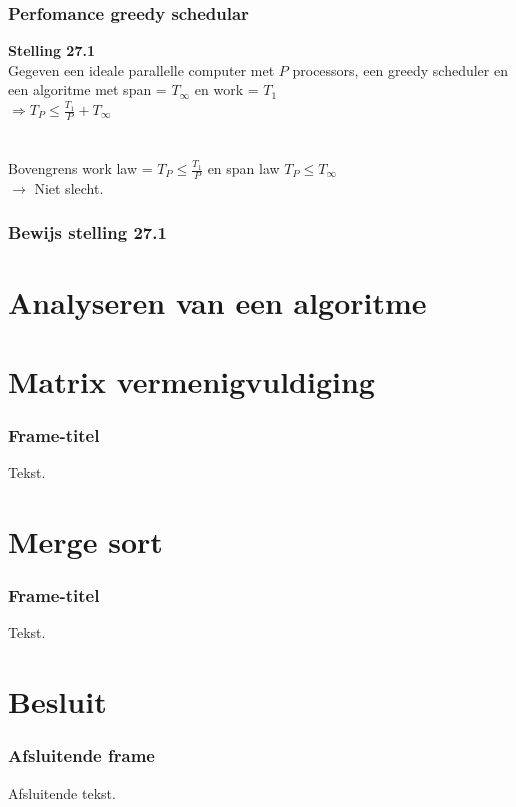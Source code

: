 \documentclass
   [kulak] %
   {kulakbeamer}
\begin{document}
\begin{frame}
	\frametitle{Perfomance greedy schedular}
	\textbf{Stelling 27.1}\\
	Gegeven een ideale parallelle computer met $P$ processors, een greedy scheduler en een algoritme met span = $T_\infty$ en work = $T_1$\\
	$\Rightarrow T_P \leqslant \frac{T_1}{P} + T_\infty$ \\~\\~\\
	Bovengrens work law = $T_P \leqslant \frac{T_1}{P}$ en span law $T_P \leqslant T_\infty$ \\
	$\rightarrow$ Niet slecht.
\end{frame}

\begin{frame}
	\frametitle{Bewijs stelling 27.1}
	
\end{frame}

\section[Analyse]{Analyseren van een algoritme}

\section[Matrix]{Matrix vermenigvuldiging}

\begin{frame}
	\frametitle{Frame-titel}
	Tekst.
\end{frame}

\section[Merge sort]{Merge sort}

\begin{frame}
	\frametitle{Frame-titel}
	Tekst.
\end{frame}

\section{Besluit}
\begin{frame}
\frametitle{Afsluitende frame}
Afsluitende tekst.
\end{frame}
\end{document}
